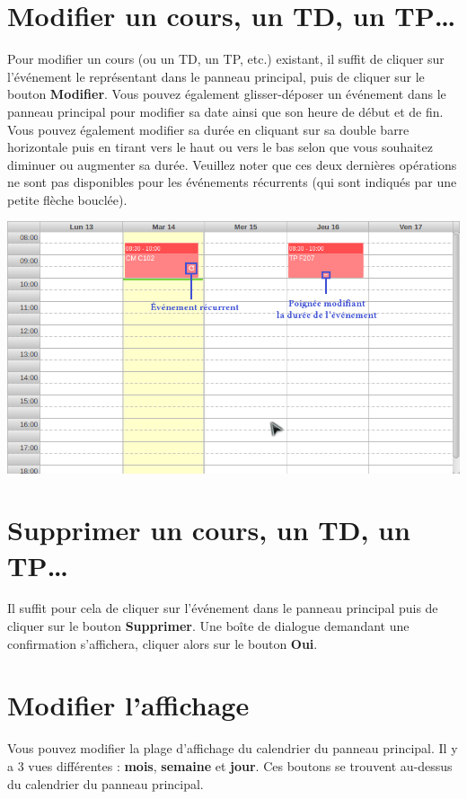\documentclass[a4paper, 11pt]{report}
\begin{document}
		\section{Modifier un cours, un TD, un TP…}
			Pour modifier un cours (ou un TD, un TP, etc.) existant, il suffit de cliquer sur l’événement le représentant dans le panneau principal, puis de cliquer sur le bouton \textbf{Modifier}. Vous pouvez également glisser-déposer un événement dans le panneau principal pour modifier sa date ainsi que son heure de début et de fin. Vous pouvez également modifier sa durée en cliquant sur sa double barre horizontale puis en tirant vers le haut ou vers le bas selon que vous souhaitez diminuer ou augmenter sa durée. Veuillez noter que ces deux dernières opérations ne sont pas disponibles pour les événements récurrents (qui sont indiqués par une petite flèche bouclée).

			\begin{center}
				\includegraphics[scale = 0.6]{modifier_evenement.png}
			\end{center}
		\section{Supprimer un cours, un TD, un TP…}
			Il suffit pour cela de cliquer sur l’événement dans le panneau principal puis de cliquer sur le bouton \textbf{Supprimer}. Une boîte de dialogue demandant une confirmation s’affichera, cliquer alors sur le bouton \textbf{Oui}.

		\section{Modifier l’affichage}
			Vous pouvez modifier la plage d’affichage du calendrier du panneau principal. Il y a 3 vues différentes : \textbf{mois}, \textbf{semaine} et \textbf{jour}. Ces boutons se trouvent au-dessus du calendrier du panneau principal.
\end{document}
